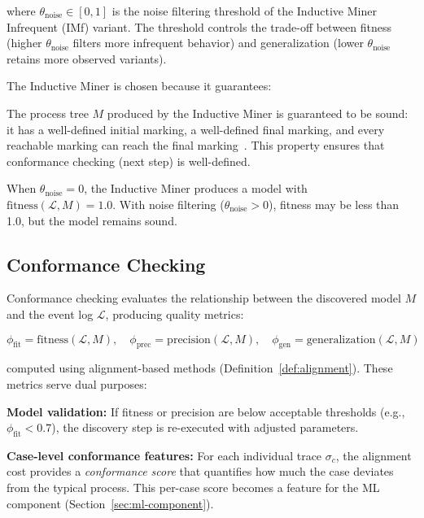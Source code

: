 where $\theta_{\text{noise}} \in [0, 1]$ is the noise filtering threshold 
of the Inductive Miner Infrequent (IMf) variant. The threshold controls 
the trade-off between fitness (higher $\theta_{\text{noise}}$ filters more 
infrequent behavior) and generalization (lower $\theta_{\text{noise}}$ 
retains more observed variants).

The Inductive Miner is chosen because it guarantees:

\begin{property}
\label{prop:soundness}
The process tree $M$ produced by the Inductive Miner is guaranteed to be 
sound: it has a well-defined initial marking, a well-defined final marking, 
and every reachable marking can reach the final 
marking~\cite{leemans2013discovering}. This property ensures that 
conformance checking (next step) is well-defined.
\end{property}

\begin{property}
\label{prop:fitness}
When $\theta_{\text{noise}} = 0$, the Inductive Miner produces a model 
with $\text{fitness}(\mathcal{L}, M) = 1.0$. With noise filtering 
($\theta_{\text{noise}} > 0$), fitness may be less than 1.0, but the 
model remains sound.
\end{property}


\subsection{Conformance Checking}
\label{sec:s2-conformance}

Conformance checking evaluates the relationship between the discovered 
model $M$ and the event log $\mathcal{L}$, producing quality metrics:

\begin{equation}
\label{eq:conformance}
\phi_{\text{fit}} = \text{fitness}(\mathcal{L}, M), \quad 
\phi_{\text{prec}} = \text{precision}(\mathcal{L}, M), \quad
\phi_{\text{gen}} = \text{generalization}(\mathcal{L}, M)
\end{equation}

computed using alignment-based methods 
(Definition~\ref{def:alignment}). These metrics serve dual purposes:

\textbf{Model validation:} If fitness or precision are below acceptable 
thresholds (e.g., $\phi_{\text{fit}} < 0.7$), the discovery step is 
re-executed with adjusted parameters.

\textbf{Case-level conformance features:} For each individual trace 
$\sigma_c$, the alignment cost provides a \emph{conformance score} 
that quantifies how much the case deviates from the typical process. 
This per-case score becomes a feature for the ML component 
(Section~\ref{sec:ml-component}).

